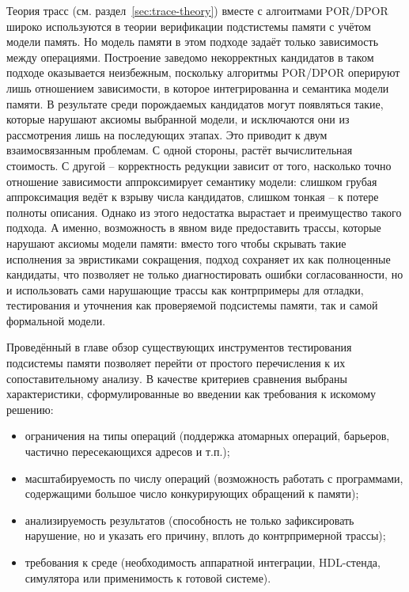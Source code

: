 Теория трасс (см. раздел~\ref{sec:trace-theory}) вместе с алгоитмами
POR/DPOR широко используются в теории верификации подстистемы памяти
с учётом модели память.
Но модель памяти в этом подходе задаёт только зависимость между операциями.
Построение заведомо некорректных кандидатов в таком подходе
оказывается неизбежным, поскольку алгоритмы POR/DPOR оперируют лишь
отношением зависимости, в которое интегрированна и семантика модели памяти.
В результате среди порождаемых кандидатов могут появляться такие,
которые нарушают аксиомы выбранной модели, и исключаются они из
рассмотрения лишь на последующих этапах.
Это приводит к двум взаимосвязанным проблемам.
С одной стороны, растёт вычислительная стоимость.
С другой -- корректность редукции зависит от того, насколько точно
отношение зависимости аппроксимирует семантику модели: слишком грубая
аппроксимация ведёт к взрыву числа кандидатов, слишком тонкая -- к
потере полноты описания.
Однако из этого недостатка вырастает и преимущество такого подхода. А
именно, возможность в явном виде предоставить трассы, которые
нарушают аксиомы модели памяти: вместо того чтобы скрывать такие
исполнения за эвристиками сокращения, подход сохраняет их как
полноценные кандидаты, что позволяет не только диагностировать ошибки
согласованности, но и использовать сами нарушающие трассы как
контрпримеры для отладки, тестирования и уточнения как проверяемой
подсистемы памяти, так и самой формальной модели.

Проведённый в главе обзор существующих инструментов тестирования
подсистемы памяти позволяет перейти от простого перечисления к их
сопоставительному анализу. В качестве критериев сравнения выбраны
характеристики, сформулированные во введении как требования к искомому решению:
\begin{itemize}
  \item ограничения на типы операций (поддержка
    атомарных операций, барьеров, частично пересекающихся адресов и т.п.);
  \item масштабируемость по числу операций
    (возможность работать с программами, содержащими большое число
    конкурирующих обращений к памяти);
  \item анализируемость результатов (способность не
      только зафиксировать нарушение, но и указать его причину, вплоть
    до контрпримерной трассы);
  \item требования к среде (необходимость аппаратной
    интеграции, HDL-стенда, симулятора или применимость к готовой системе).
\end{itemize}

